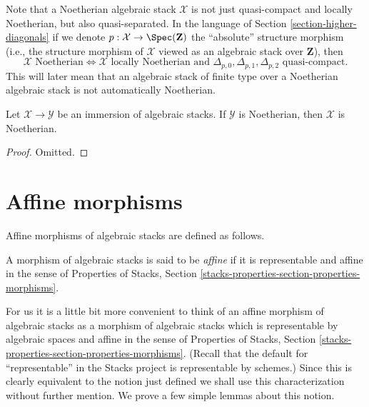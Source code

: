 \noindent
Note that a Noetherian algebraic stack $\mathcal{X}$ is not just quasi-compact
and locally Noetherian, but also quasi-separated. In the language of
Section \ref{section-higher-diagonals}
if we denote $p : \mathcal{X} \to \Spec(\mathbf{Z})$ the
``absolute'' structure morphism (i.e., the structure morphism of
$\mathcal{X}$ viewed as an algebraic stack over $\mathbf{Z}$), then
$$
\mathcal{X}\text{ Noetherian}
\Leftrightarrow
\mathcal{X}\text{ locally Noetherian and }
\Delta_{p, 0}, \Delta_{p, 1}, \Delta_{p, 2}
\text{ quasi-compact}.
$$
This will later mean that an algebraic stack of finite type over a
Noetherian algebraic stack is not automatically Noetherian.

\begin{lemma}
\label{lemma-locally-closed-in-noetherian}
Let $\mathcal{X} \to \mathcal{Y}$ be an immersion of algebraic stacks.
If $\mathcal{Y}$ is Noetherian, then $\mathcal{X}$ is Noetherian.
\end{lemma}

\begin{proof}
Omitted.
\end{proof}






\section{Affine morphisms}
\label{section-affine}

\noindent
Affine morphisms of algebraic stacks are defined as follows.

\begin{definition}
\label{definition-affine}
A morphism of algebraic stacks is said to be {\it affine}
if it is representable and affine in the sense of
Properties of Stacks, Section
\ref{stacks-properties-section-properties-morphisms}.
\end{definition}

\noindent
For us it is a little bit more convenient to think of an affine
morphism of algebraic stacks as a morphism of algebraic stacks which is
representable by algebraic spaces and affine in the sense of
Properties of Stacks, Section
\ref{stacks-properties-section-properties-morphisms}.
(Recall that the default for ``representable'' in the Stacks project
is representable by schemes.)
Since this is clearly equivalent to the notion just defined we shall
use this characterization without further mention.
We prove a few simple lemmas about this notion.

